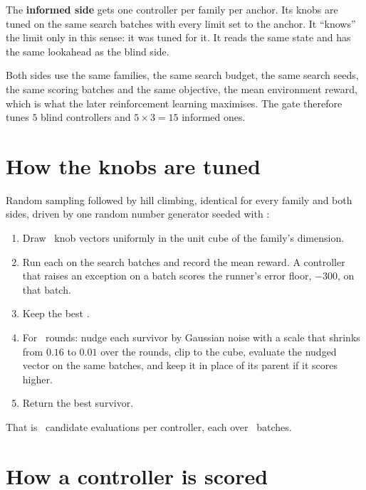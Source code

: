 \documentclass[11pt,a4paper]{article}
\begin{document}
The \textbf{informed side} gets one controller per family per anchor. Its
knobs are tuned on the same search batches with every limit set to the
anchor. It ``knows'' the limit only in this sense: it was tuned for it. It
reads the same state and has the same lookahead as the blind side.

Both sides use the same families, the same search budget, the same search
seeds, the same scoring batches and the same objective, the mean environment
reward, which is what the later reinforcement learning maximises. The gate
therefore tunes $5$ blind controllers and $5\times3=15$ informed ones.

\section{How the knobs are tuned}
\label{sec:search}

Random sampling followed by hill climbing, identical for every family and
both sides, driven by one random number generator seeded with
\SZsearchseed:
\begin{enumerate}[leftmargin=1.8em]
  \item Draw \SZnrandom\ knob vectors uniformly in the unit cube of the
  family's dimension.
  \item Run each on the search batches and record the mean reward. A
  controller that raises an exception on a batch scores the runner's error
  floor, $-300$, on that batch.
  \item Keep the best \SZtopk.
  \item For \SZnclimb\ rounds: nudge each survivor by Gaussian noise with a
  scale that shrinks from $0.16$ to $0.01$ over the rounds, clip to the cube,
  evaluate the nudged vector on the same batches, and keep it in place of its
  parent if it scores higher.
  \item Return the best survivor.
\end{enumerate}
That is \SZnevals\ candidate evaluations per controller, each over
\SZnsearch\ batches.

\section{How a controller is scored}
\label{sec:scoring}
\end{document}
